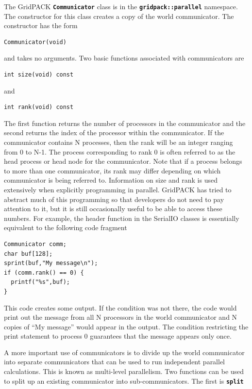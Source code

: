 The GridPACK \texttt{\textbf{Communicator}} class is in the \texttt{\textbf{gridpack::parallel}} namespace. The constructor for this class creates a copy of the world communicator. The constructor has the form

{
\color{red}
\begin{Verbatim}[fontseries=b]
Communicator(void)
\end{Verbatim}
}

and takes no arguments. Two basic functions associated with communicators are

{
\color{red}
\begin{Verbatim}[fontseries=b]
int size(void) const
\end{Verbatim}
}

and

{
\color{red}
\begin{Verbatim}[fontseries=b]
int rank(void) const
\end{Verbatim}
}

The first function returns the number of processors in the communicator and the second returns the index of the processor within the communicator. If the communicator contains N processes, then the rank will be an integer ranging from 0 to N-1. The process corresponding to rank 0 is often referred to as the head process or head node for the communicator. Note that if a process belongs to more than one communicator, its rank may differ depending on which communicator is being referred to. Information on size and rank is used extensively when explicitly programming in parallel. GridPACK has tried to abstract much of this programming so that developers do not need to pay attention to it, but it is still occasionally useful to be able to access these numbers. For example, the header function in the SerialIO classes is essentially equivalent to the following code fragment

{
\color{red}
\begin{Verbatim}[fontseries=b]
Communicator comm;
char buf[128];
sprint(buf,"My message\n");
if (comm.rank() == 0) {
  printf("%s",buf);
}
\end{Verbatim}
}

This code creates some output. If the condition was not there, the code would print out the message from all N processors in the world communicator and N copies of ``My message'' would appear in the output. The condition restricting the print statement to process 0 guarantees that the message appears only once.

A more important use of communicators is to divide up the world communicator into separate communicators that can be used to run independent parallel calculations. This is known as multi-level parallelism. Two functions can be used to split up an existing communicator into sub-communicators. The first is \texttt{\textbf{split}}

